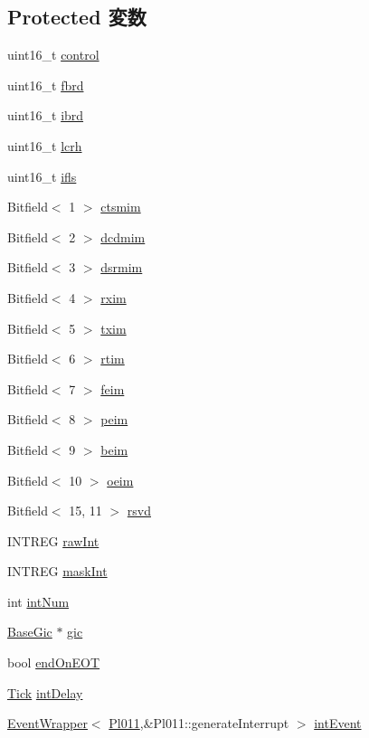 \subsection*{Protected 変数}
\begin{DoxyCompactItemize}
\item 
uint16\_\-t \hyperlink{classPl011_a10e251ca482543ec4f81f4006b000aed}{control}
\item 
uint16\_\-t \hyperlink{classPl011_aa3ac821540cc12f9e0436651df0b1642}{fbrd}
\item 
uint16\_\-t \hyperlink{classPl011_a2be86c72c0a31f12141cb12224bc04b8}{ibrd}
\item 
uint16\_\-t \hyperlink{classPl011_a56614119b1851bb3386d42f108644601}{lcrh}
\item 
uint16\_\-t \hyperlink{classPl011_a832059b95a1d4d0dc403ccf467926370}{ifls}
\item 
Bitfield$<$ 1 $>$ \hyperlink{classPl011_ac6a6841bbd78ac1a329c8e1e6a6dd51b}{ctsmim}
\item 
Bitfield$<$ 2 $>$ \hyperlink{classPl011_a40464feb8779903fa2eb809556b2c537}{dcdmim}
\item 
Bitfield$<$ 3 $>$ \hyperlink{classPl011_abdf5197925837e4ab21e9342961419d6}{dsrmim}
\item 
Bitfield$<$ 4 $>$ \hyperlink{classPl011_a38bbcf2758baf4ae6295a663465f65ce}{rxim}
\item 
Bitfield$<$ 5 $>$ \hyperlink{classPl011_a36c89652928b36336c1a9d4957e2813b}{txim}
\item 
Bitfield$<$ 6 $>$ \hyperlink{classPl011_a1f3d61050228be20dfe8ed8b9b94090d}{rtim}
\item 
Bitfield$<$ 7 $>$ \hyperlink{classPl011_a705d2bcd8e859d1b15dd6e128533b295}{feim}
\item 
Bitfield$<$ 8 $>$ \hyperlink{classPl011_ab3404a9d5be230ce73a00d31bdf777a0}{peim}
\item 
Bitfield$<$ 9 $>$ \hyperlink{classPl011_a8a3f2c2dd111d2dffbb1c54cbdc11e48}{beim}
\item 
Bitfield$<$ 10 $>$ \hyperlink{classPl011_aea5955c20392fa25a1c7a1359bcfc123}{oeim}
\item 
Bitfield$<$ 15, 11 $>$ \hyperlink{classPl011_a996c37eb2080c15ad39204ff8bb4c6dd}{rsvd}
\item 
INTREG \hyperlink{classPl011_ae2da020b580eb106d7e66a6b058a9e6d}{rawInt}
\item 
INTREG \hyperlink{classPl011_adca828df6ee9e8b800f1b5b229476304}{maskInt}
\item 
int \hyperlink{classPl011_a9bd4d49b818d8cf1a6dee0576d2ff039}{intNum}
\item 
\hyperlink{classBaseGic}{BaseGic} $\ast$ \hyperlink{classPl011_a2e2266dca56928f63667e994933169ee}{gic}
\item 
bool \hyperlink{classPl011_aad163d2d82e9b9e707ca4da55b667c1e}{endOnEOT}
\item 
\hyperlink{base_2types_8hh_a5c8ed81b7d238c9083e1037ba6d61643}{Tick} \hyperlink{classPl011_a0dad0b6dbada03eb5daf9c1ed859d62e}{intDelay}
\item 
\hyperlink{classEventWrapper}{EventWrapper}$<$ \hyperlink{classPl011}{Pl011},\&Pl011::generateInterrupt $>$ \hyperlink{classPl011_a2d115d060cc035b8f10239e7bcc104f0}{intEvent}
\end{DoxyCompactItemize}
